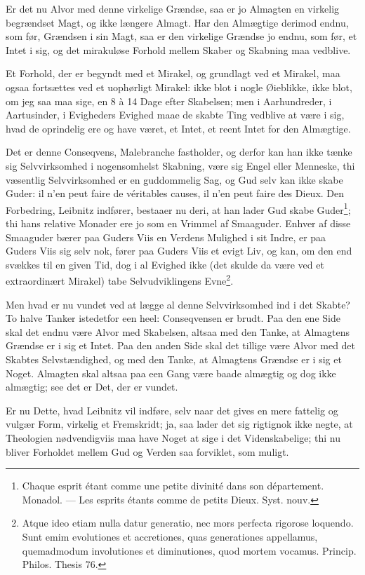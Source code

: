 \documentclass[12pt,a4paper]{article}
\newcommand{\opage}[1]{\marginnote{\footnotesize\textit{[#1]}}}
\begin{document}
Er det nu Alvor med denne virkelige Grændse, saa er jo Almagten en virkelig
begrændset Magt, og ikke længere Almagt. Har den Almægtige derimod endnu, som
før, Grændsen i sin Magt, saa er den virkelige Grændse jo endnu, som før, et
Intet i sig, og det mirakuløse Forhold mellem Skaber og Skabning maa vedblive.

Et Forhold, der er begyndt med et Mirakel, og grundlagt ved et Mirakel, maa ogsaa
fortsættes ved et uophørligt Mirakel: ikke blot i nogle Øieblikke, ikke blot, om
jeg saa maa sige, en 8 à 14 Dage efter Skabelsen; men i Aarhundreder, i
Aartusinder, i Evigheders Evighed maae de skabte Ting vedblive at være i sig,
hvad de oprindelig ere og have været, et Intet, et reent Intet for den Almægtige.

Det er denne Conseqvens, Malebranche fastholder, og derfor kan han ikke tænke sig
Selvvirksomhed i nogensomhelst Skabning, være sig Engel eller Menneske, thi
væsentlig Selvvirksomhed er en guddommelig Sag, og Gud selv kan ikke skabe Guder:
il n'en peut faire de véritables causes, il n'en peut faire des Dieux.
\opage{26} Den Forbedring, Leibnitz indfører, bestaaer nu deri, at han lader Gud skabe
Guder\footnote{Chaque esprit étant comme une petite divinité dans son
département. Monadol. --- Les esprits étants comme de petits Dieux. Syst.
nouv.}; thi hans relative Monader ere jo som en Vrimmel af Smaaguder. Enhver af
disse Smaaguder bærer paa Guders Viis en Verdens Mulighed i sit Indre, er paa
Guders Viis sig selv nok, fører paa Guders Viis et evigt Liv, og kan, om den end
svækkes til en given Tid, dog i al Evighed ikke (det skulde da være ved et
extraordinært Mirakel) tabe Selvudviklingens Evne\footnote{Atque ideo etiam nulla
datur generatio, nec mors perfecta rigorose loquendo. Sunt emim evolutiones et
accretiones, quas generationes appellamus, quemadmodum involutiones et
diminutiones, quod mortem vocamus. Princip. Philos. Thesis 76.}.

Men hvad er nu vundet ved at lægge al denne Selvvirksomhed ind i det Skabte? To
halve Tanker istedetfor een heel: Conseqvensen er brudt. Paa den ene Side skal
det endnu være Alvor med Skabelsen, altsaa med den Tanke, at Almagtens Grændse er
i sig et Intet. Paa den anden Side skal det tillige være Alvor med det Skabtes
Selvstændighed, og med den Tanke, at Almagtens Grændse er i sig et Noget.
Almagten skal altsaa paa een Gang være baade almægtig og dog ikke almægtig; see
det er Det, der er vundet.

Er nu Dette, hvad Leibnitz vil indføre, selv naar det gives en mere fattelig og
vulgær Form, virkelig et Fremskridt; ja, saa lader det sig rigtignok ikke negte,
at Theologien nødvendigviis maa have Noget at sige i det Videnskabelige; thi nu
bliver Forholdet mellem Gud og Verden saa forviklet, som muligt.
\end{document}
